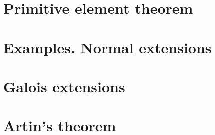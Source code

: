 \section{Primitive element theorem}
\section{Examples. Normal extensions}
\section{Galois extensions}
\section{Artin's theorem}
